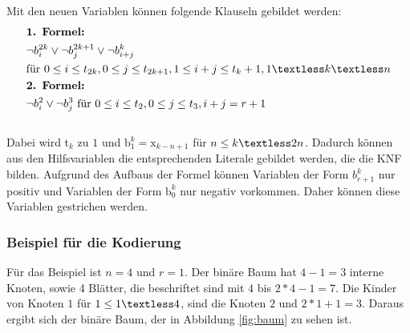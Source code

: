 \documentclass[a4,abstract=on]{scrartcl}
\begin{document}
Mit den neuen Variablen können folgende Klauseln gebildet werden:\\
\begin{align*}
&\textbf{1. Formel:}\\
&\neg b_i^{2k} \vee \neg b_j^{2k+1} \vee \neg b_{i+j}^{k} \\
&\text{für} {~} 0\leq i \leq t_{2k}, 0\leq j \leq t_{2k+1}, 1\leq i+j \leq t_{k}+1, 1\textless k \textless n\\
&\textbf{2. Formel:}\\
&\neg b_i^2 \vee \neg b_j^3 {~} \text{für} {~} 0\leq i \leq t_2, 0\leq j \leq t_3, i+j = r+1\\
\end{align*}
\ \\
Dabei wird $\text{t}_k$ zu $1$ und $\text{b}_1^k = \text{x}_{k-n+1}$ für $n \leq k \textless 2n$. Dadurch können aus den Hilfsvariablen die entsprechenden Literale gebildet werden, die die KNF bilden.
Aufgrund des Aufbaus der Formel können Variablen der Form $b_{r+1}^k$ nur positiv und Variablen der Form $\text{b}_0^k$ nur negativ vorkommen. Daher können diese Variablen gestrichen werden.

\subsubsection*{Beispiel für die Kodierung}
Für das Beispiel ist $n=4$ und $r =1$. Der binäre Baum hat $4-1 = 3$ interne Knoten, sowie 4 Blätter, die beschriftet sind mit $4$ bis $2*4-1=7$. Die Kinder von Knoten $1$  für $1 \leq 1 \textless 4$, sind die Knoten $2$ und $2*1 +1=3$. Daraus ergibt sich der binäre Baum, der in Abbildung \ref{fig:baum} zu sehen ist.
\end{document}
